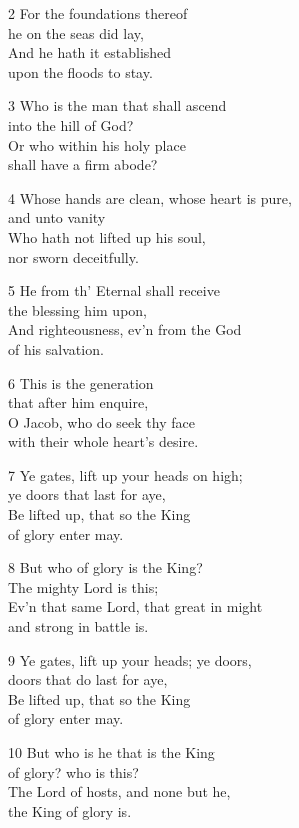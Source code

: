 2 For the foundations thereof\\
he on the seas did lay,\\
And he hath it established\\
upon the floods to stay.

3 Who is the man that shall ascend\\
into the hill of God?\\
Or who within his holy place\\
shall have a firm abode?

4 Whose hands are clean, whose heart is pure,\\
and unto vanity\\
Who hath not lifted up his soul,\\
nor sworn deceitfully.

5 He from th’ Eternal shall receive\\
the blessing him upon,\\
And righteousness, ev’n from the God\\
of his salvation.

6 This is the generation\\
that after him enquire,\\
O Jacob, who do seek thy face\\
with their whole heart’s desire.

7 Ye gates, lift up your heads on high;\\
ye doors that last for aye,\\
Be lifted up, that so the King\\
of glory enter may.

8 But who of glory is the King?\\
The mighty Lord is this;\\
Ev’n that same Lord, that great in might\\
and strong in battle is.

9 Ye gates, lift up your heads; ye doors,\\
doors that do last for aye,\\
Be lifted up, that so the King\\
of glory enter may.

10 But who is he that is the King\\
of glory? who is this?\\
The Lord of hosts, and none but he,\\
the King of glory is.

\begin{center}
\quad{}\quad{}
\end{center}

